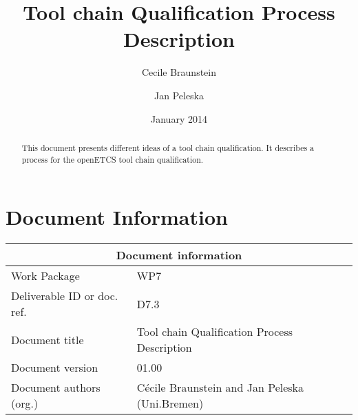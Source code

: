 \documentclass{openetcs_report}
\begin{document}
\frontmatter
{}




\title{Tool chain Qualification Process Description}


\date{January 2014}


\author{Cecile Braunstein \and Jan Peleska}







\begin{abstract}
This document presents  different ideas of a tool chain
qualification. It describes a process  for the openETCS tool chain
qualification.  
\end{abstract}

\maketitle
\tableofcontents

\newpage

\chapter{Document Information}
\begin{tabular}{|p{4.4cm}|p{8.7cm}|}
\hline
\multicolumn{2}{|c|}{Document information} \\
\hline
Work Package &  WP7  \\
Deliverable ID or doc. ref. & D7.3\\
\hline
Document title & Tool chain Qualification Process Description \\
Document version & 01.00 \\
Document authors (org.)  & Cécile Braunstein and Jan Peleska (Uni.Bremen) \\
\hline
\end{tabular}
\end{document}
